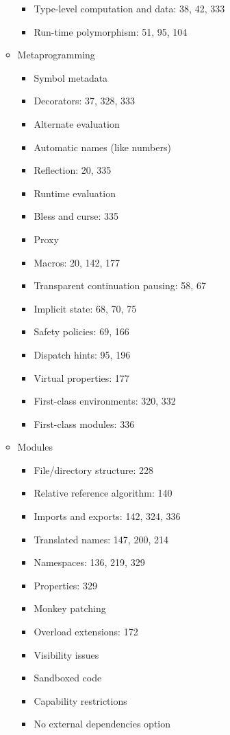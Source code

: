 \begin{itemize}
\begin{itemize}
\begin{itemize}
    \item Type-level computation and data: 38, 42, 333
    \item Run-time polymorphism: 51, 95, 104
    \end{itemize}
  \item Metaprogramming
    \begin{itemize}
    \item Symbol metadata
    \item Decorators: 37, 328, 333
    \item Alternate evaluation
    \item Automatic names (like numbers)
    \item Reflection: 20, 335
    \item Runtime evaluation
    \item Bless and curse: 335
    \item Proxy
    \item Macros: 20, 142, 177
    \item Transparent continuation pausing: 58, 67
    \item Implicit state: 68, 70, 75
    \item Safety policies: 69, 166
    \item Dispatch hints: 95, 196
    \item Virtual properties: 177
    \item First-class environments: 320, 332
    \item First-class modules: 336
    \end{itemize}
  \item Modules
    \begin{itemize}
    \item File/directory structure: 228
    \item Relative reference algorithm: 140
    \item Imports and exports: 142, 324, 336
    \item Translated names: 147, 200, 214
    \item Namespaces: 136, 219, 329
    \item Properties: 329
    \item Monkey patching
    \item Overload extensions: 172
    \item Visibility issues
    \item Sandboxed code
    \item Capability restrictions
    \item No external dependencies option

\end{itemize}
\end{itemize}
\end{itemize}
